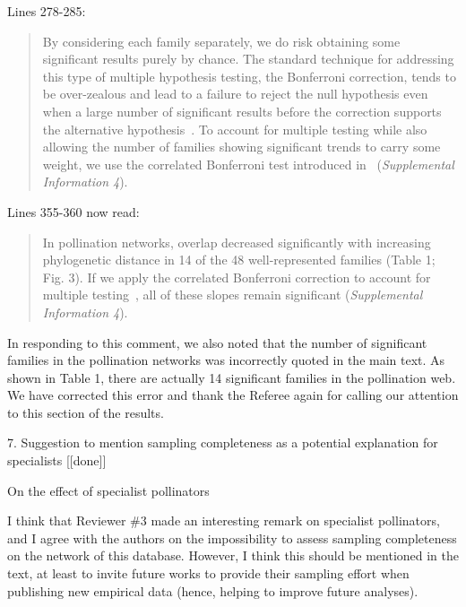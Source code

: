 \documentclass[12pt]{letter}
\newenvironment{refquote}{\bigskip \begin{it}}{\end{it}\smallskip}
\begin{document}
		Lines 278-285:

		\begin{quotation}

			By considering each family separately, we do risk obtaining some significant results purely by chance. The standard technique for addressing this type of multiple hypothesis testing, the Bonferroni correction, tends to be over-zealous and lead to a failure to reject the null hypothesis even when a large number of significant results before the correction supports the alternative hypothesis~\citep{Moran2003}. To account for multiple testing while also allowing the number of families showing significant trends to carry some weight, we use the correlated Bonferroni test introduced in~\citet{Drezner2016} (\emph{Supplemental Information 4}).

		\end{quotation}


		Lines 355-360 now read:

		\begin{quotation}
			 In pollination networks, overlap decreased significantly with increasing phylogenetic distance in 14 of the 48 well-represented families (Table 1; Fig. 3). If we apply the correlated Bonferroni correction to account for multiple testing~\citep{Drezner2016}, all of these slopes remain significant (\emph{Supplemental Information 4}).
		\end{quotation}


		In responding to this comment, we also noted that the number of significant families in the pollination networks was incorrectly quoted in the main text. As shown in Table 1, there are actually 14 significant families in the pollination web. We have corrected this error and thank the Referee again for calling our attention to this section of the results.


	7. Suggestion to mention sampling completeness as a potential explanation for specialists [[done]]

		\begin{refquote}
			On the effect of specialist pollinators

			I think that Reviewer \#3 made an interesting remark on specialist pollinators, and I agree with the authors on the impossibility to assess sampling completeness on the network of this database. However, I think this should be mentioned in the text, at least to invite future works to provide their sampling effort when publishing new empirical data (hence, helping to improve future analyses).
		\end{refquote}
\end{document}
